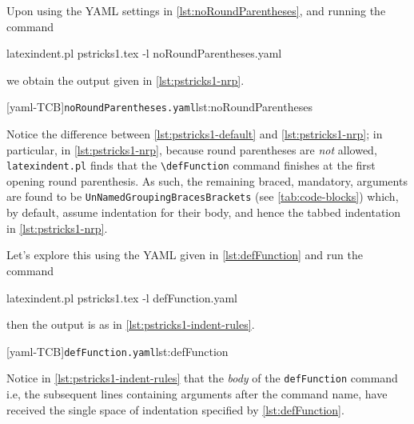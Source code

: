  Upon using the YAML settings in \cref{lst:noRoundParentheses}, and running the command
 \begin{commandshell}
latexindent.pl pstricks1.tex -l noRoundParentheses.yaml
\end{commandshell}
 we obtain the output given in \cref{lst:pstricks1-nrp}.

 \begin{cmhtcbraster}[raster column skip=.1\linewidth]
  [yaml-TCB]{\texttt{noRoundParentheses.yaml}}{lst:noRoundParentheses}
 \end{cmhtcbraster}

 Notice the difference between \cref{lst:pstricks1-default} and \cref{lst:pstricks1-nrp};
 in particular, in \cref{lst:pstricks1-nrp}, because round parentheses are \emph{not}
 allowed, \texttt{latexindent.pl} finds that the \lstinline!\defFunction! command finishes
 at the first opening round parenthesis. As such, the remaining braced, mandatory,
 arguments are found to be \texttt{UnNamedGroupingBracesBrackets} (see
 \vref{tab:code-blocks}) which, by default, assume indentation for their body, and hence
 the tabbed indentation in \cref{lst:pstricks1-nrp}.

 Let's explore this using the YAML given in \cref{lst:defFunction} and run the command
 \begin{commandshell}
latexindent.pl pstricks1.tex -l defFunction.yaml
\end{commandshell}
 then the output is as in \cref{lst:pstricks1-indent-rules}.

 \begin{cmhtcbraster}[raster column skip=.1\linewidth]
  [yaml-TCB]{\texttt{defFunction.yaml}}{lst:defFunction}
 \end{cmhtcbraster}

 Notice in \cref{lst:pstricks1-indent-rules} that the \emph{body} of the
 \lstinline!defFunction! command i.e, the subsequent lines containing arguments after the
 command name, have received the single space of indentation specified by
 \cref{lst:defFunction}.

